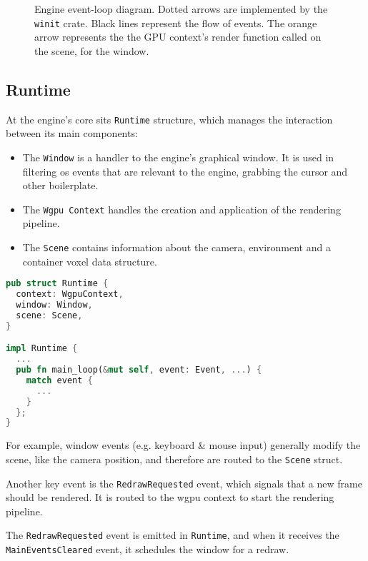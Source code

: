 \begin{figure}[H]
  \centering
  
  \caption[Egine event loop]{Engine event-loop diagram. Dotted arrows are implemented by the \texttt{winit} crate. Black lines represent the flow of events. The orange arrow represents the the GPU context's render function called on the scene, for the window.}
\end{figure}


\subsection{Runtime}
\begin{samepage}
At the engine's core sits \texttt{Runtime}  structure, which manages the interaction between its main components:
\begin{itemize}
  \item The \texttt{Window} is a handler to the engine's graphical window. It is used in filtering \acrshort{os} events that are relevant to the engine, grabbing the cursor and other boilerplate.
  \item The \texttt{Wgpu Context} handles the creation and application of the rendering pipeline.
  \item The \texttt{Scene} contains information about the camera, environment and a container voxel data structure.
\end{itemize}
\end{samepage}

\begin{lstlisting}[language=rust,caption={Runtime definition},captionpos=b]
pub struct Runtime {
  context: WgpuContext,
  window: Window,
  scene: Scene,
}

impl Runtime {
  ...
  pub fn main_loop(&mut self, event: Event, ...) {
    match event {
      ...
    }
  };
}
\end{lstlisting}


For example, window events (e.g. keyboard \& mouse input) generally modify the scene, like the camera position, and therefore are routed to the \verb|Scene| struct.

Another key event is the \verb|RedrawRequested| event, which signals that a new frame should be rendered. It is routed to the wgpu context to start the rendering pipeline.

The \verb|RedrawRequested| event is emitted in \verb|Runtime|, and when it receives the \verb|MainEventsCleared| event, it schedules the window for a redraw.


